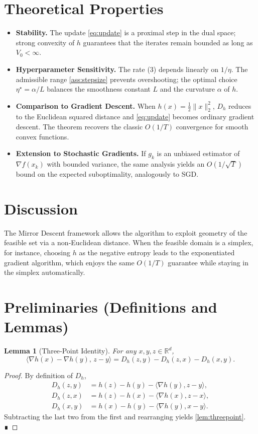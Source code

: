 \documentclass{article}
\newtheorem{lemma}{Lemma}
\newcommand{\grad}{\nabla}
\newcommand{\R}{\mathbb{R}}
\begin{document}
\section*{Theoretical Properties}
\begin{itemize}
\item \textbf{Stability.} The update \eqref{eq:update} is a proximal step in the dual space; strong convexity of $h$ guarantees that the iterates remain bounded as long as $V_{0}<\infty$.
\item \textbf{Hyperparameter Sensitivity.} The rate (3) depends linearly on $1/\eta$. The admissible range \eqref{ass:stepsize} prevents overshooting; the optimal choice $\eta^{\star}=\alpha/L$ balances the smoothness constant $L$ and the curvature $\alpha$ of $h$.
\item \textbf{Comparison to Gradient Descent.} When $h(x)=\frac12\|x\|_{2}^{2}$, $D_{h}$ reduces to the Euclidean squared distance and \eqref{eq:update} becomes ordinary gradient descent. The theorem recovers the classic $O(1/T)$ convergence for smooth convex functions.
\item \textbf{Extension to Stochastic Gradients.} If $g_{k}$ is an unbiased estimator of $\grad f(x_{k})$ with bounded variance, the same analysis yields an $O(1/\sqrt{T})$ bound on the expected suboptimality, analogously to SGD.
\end{itemize}

\section*{Discussion}
The Mirror Descent framework allows the algorithm to exploit geometry of the feasible set via a non‑Euclidean distance. When the feasible domain is a simplex, for instance, choosing $h$ as the negative entropy leads to the exponentiated gradient algorithm, which enjoys the same $O(1/T)$ guarantee while staying in the simplex automatically.

\newpage
\section*{Preliminaries (Definitions and Lemmas)}
\begin{lemma}[Three‑Point Identity]\label{lem:threepoint}
For any $x,y,z\in\R^{d}$,
\[
\langle \nabla h(x)-\nabla h(y),\,z-y\rangle
= D_{h}(z,y)-D_{h}(z,x)-D_{h}(x,y).
\tag{4}
\]
\end{lemma}
\begin{proof}
By definition of $D_{h}$,
\[
\begin{aligned}
D_{h}(z,y)&=h(z)-h(y)-\langle\nabla h(y),z-y\rangle,\\
D_{h}(z,x)&=h(z)-h(x)-\langle\nabla h(x),z-x\rangle,\\
D_{h}(x,y)&=h(x)-h(y)-\langle\nabla h(y),x-y\rangle.
\end{aligned}
\]
Subtracting the last two from the first and rearranging yields \eqref{lem:threepoint}. ∎
\end{proof}
\end{document}
